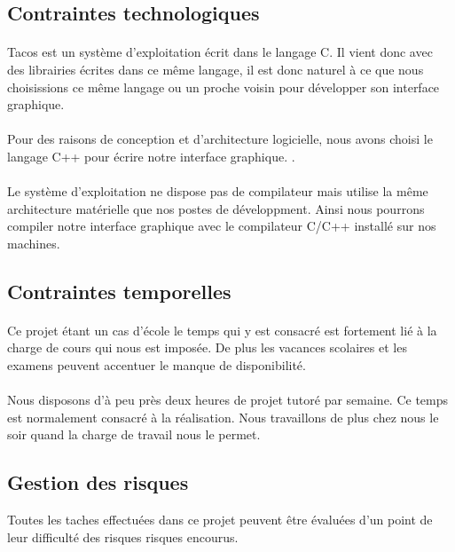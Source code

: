 
\subsection{Contraintes technologiques}
\paragraph{}
Tacos est un système d'exploitation écrit dans le langage C. Il vient donc avec des librairies écrites dans ce même langage, il est donc naturel à ce que nous choisissions ce même langage ou un proche voisin pour développer son interface graphique.
\paragraph{}
Pour des raisons de conception et d'architecture logicielle, nous avons choisi le langage C++ pour écrire notre interface graphique. . 
\paragraph{}
Le système d'exploitation ne dispose pas de compilateur mais utilise la même architecture matérielle que nos postes de développment. Ainsi nous pourrons compiler notre interface graphique avec le compilateur C/C++ installé sur nos machines.
\subsection{Contraintes temporelles}
\paragraph{}
Ce projet étant un cas d'école le temps qui y est consacré est fortement lié à la charge de cours qui nous est imposée. 
De plus les vacances scolaires et les examens peuvent accentuer le manque de disponibilité.
\paragraph{}
Nous disposons d'à peu près deux heures de projet tutoré par semaine. Ce temps est normalement consacré à la réalisation. Nous travaillons de plus chez nous le soir quand la charge de travail nous le permet.
\subsection{Gestion des risques}
Toutes les taches effectuées dans ce projet peuvent être évaluées d'un point de leur difficulté des risques risques encourus.
